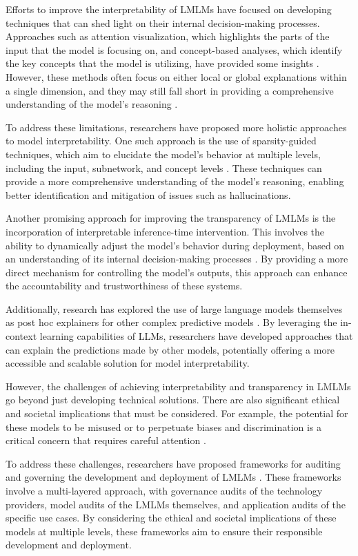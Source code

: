 \documentclass[11pt]{article}
\begin{document}
Efforts to improve the interpretability of LMLMs have focused on developing techniques that can shed light on their internal decision-making processes. Approaches such as attention visualization, which highlights the parts of the input that the model is focusing on, and concept-based analyses, which identify the key concepts that the model is utilizing, have provided some insights \cite{ref332}. However, these methods often focus on either local or global explanations within a single dimension, and they may still fall short in providing a comprehensive understanding of the model's reasoning \cite{ref183}.

To address these limitations, researchers have proposed more holistic approaches to model interpretability. One such approach is the use of sparsity-guided techniques, which aim to elucidate the model's behavior at multiple levels, including the input, subnetwork, and concept levels \cite{ref183}. These techniques can provide a more comprehensive understanding of the model's reasoning, enabling better identification and mitigation of issues such as hallucinations.

Another promising approach for improving the transparency of LMLMs is the incorporation of interpretable inference-time intervention. This involves the ability to dynamically adjust the model's behavior during deployment, based on an understanding of its internal decision-making processes \cite{ref183}. By providing a more direct mechanism for controlling the model's outputs, this approach can enhance the accountability and trustworthiness of these systems.

Additionally, research has explored the use of large language models themselves as post hoc explainers for other complex predictive models \cite{ref334}. By leveraging the in-context learning capabilities of LLMs, researchers have developed approaches that can explain the predictions made by other models, potentially offering a more accessible and scalable solution for model interpretability.

However, the challenges of achieving interpretability and transparency in LMLMs go beyond just developing technical solutions. There are also significant ethical and societal implications that must be considered. For example, the potential for these models to be misused or to perpetuate biases and discrimination is a critical concern that requires careful attention \cite{ref233}.

To address these challenges, researchers have proposed frameworks for auditing and governing the development and deployment of LMLMs \cite{ref233}. These frameworks involve a multi-layered approach, with governance audits of the technology providers, model audits of the LMLMs themselves, and application audits of the specific use cases. By considering the ethical and societal implications of these models at multiple levels, these frameworks aim to ensure their responsible development and deployment.
\end{document}
